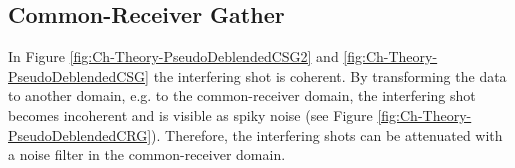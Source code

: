 \subsection{Common-Receiver Gather}

In Figure \ref{fig:Ch-Theory-PseudoDeblendedCSG2} and \ref{fig:Ch-Theory-PseudoDeblendedCSG} the interfering shot is coherent. By transforming the data to another domain, e.g. to the common-receiver domain, the interfering shot becomes incoherent  and is visible as spiky noise (see Figure \ref{fig:Ch-Theory-PseudoDeblendedCRG}). Therefore, the interfering shots can be attenuated with a noise filter in the common-receiver domain. 


